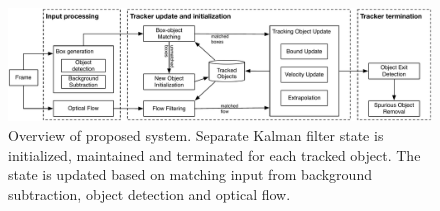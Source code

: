 \begin{figure}[!htbp]
\begin{center}
    \includegraphics[width=\linewidth]{./img/kalmanFilterTracker.pdf}
\end{center}
   \caption{Overview of proposed system. Separate Kalman filter state is initialized, maintained and terminated for each tracked object. The state is updated based on matching input from background subtraction, object detection and optical flow.}
\label{fig:kf-tracker-workflow}
\end{figure}